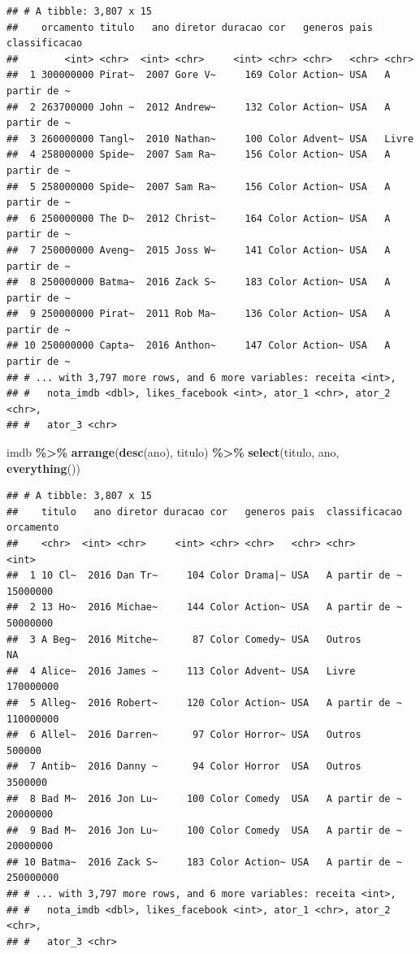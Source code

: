 \documentclass[
]{book}
\newenvironment{Shaded}{\begin{snugshade}}{\end{snugshade}}
\newcommand{\KeywordTok}[1]{\textcolor[rgb]{0.13,0.29,0.53}{\textbf{#1}}}
\newcommand{\NormalTok}[1]{#1}
\newcommand{\OperatorTok}[1]{\textcolor[rgb]{0.81,0.36,0.00}{\textbf{#1}}}
\newcommand{\StringTok}[1]{\textcolor[rgb]{0.31,0.60,0.02}{#1}}
\begin{document}
\begin{verbatim}
## # A tibble: 3,807 x 15
##    orcamento titulo   ano diretor duracao cor   generos pais  classificacao
##        <int> <chr>  <int> <chr>     <int> <chr> <chr>   <chr> <chr>        
##  1 300000000 Pirat~  2007 Gore V~     169 Color Action~ USA   A partir de ~
##  2 263700000 John ~  2012 Andrew~     132 Color Action~ USA   A partir de ~
##  3 260000000 Tangl~  2010 Nathan~     100 Color Advent~ USA   Livre        
##  4 258000000 Spide~  2007 Sam Ra~     156 Color Action~ USA   A partir de ~
##  5 258000000 Spide~  2007 Sam Ra~     156 Color Action~ USA   A partir de ~
##  6 250000000 The D~  2012 Christ~     164 Color Action~ USA   A partir de ~
##  7 250000000 Aveng~  2015 Joss W~     141 Color Action~ USA   A partir de ~
##  8 250000000 Batma~  2016 Zack S~     183 Color Action~ USA   A partir de ~
##  9 250000000 Pirat~  2011 Rob Ma~     136 Color Action~ USA   A partir de ~
## 10 250000000 Capta~  2016 Anthon~     147 Color Action~ USA   A partir de ~
## # ... with 3,797 more rows, and 6 more variables: receita <int>,
## #   nota_imdb <dbl>, likes_facebook <int>, ator_1 <chr>, ator_2 <chr>,
## #   ator_3 <chr>
\end{verbatim}

\begin{Shaded}
\begin{Highlighting}[]
\NormalTok{imdb }\OperatorTok{\%>\%}
\StringTok{  }\KeywordTok{arrange}\NormalTok{(}\KeywordTok{desc}\NormalTok{(ano), titulo) }\OperatorTok{\%>\%}
\StringTok{  }\KeywordTok{select}\NormalTok{(titulo, ano, }\KeywordTok{everything}\NormalTok{())}
\end{Highlighting}
\end{Shaded}

\begin{verbatim}
## # A tibble: 3,807 x 15
##    titulo   ano diretor duracao cor   generos pais  classificacao orcamento
##    <chr>  <int> <chr>     <int> <chr> <chr>   <chr> <chr>             <int>
##  1 10 Cl~  2016 Dan Tr~     104 Color Drama|~ USA   A partir de ~  15000000
##  2 13 Ho~  2016 Michae~     144 Color Action~ USA   A partir de ~  50000000
##  3 A Beg~  2016 Mitche~      87 Color Comedy~ USA   Outros               NA
##  4 Alice~  2016 James ~     113 Color Advent~ USA   Livre         170000000
##  5 Alleg~  2016 Robert~     120 Color Action~ USA   A partir de ~ 110000000
##  6 Allel~  2016 Darren~      97 Color Horror~ USA   Outros           500000
##  7 Antib~  2016 Danny ~      94 Color Horror  USA   Outros          3500000
##  8 Bad M~  2016 Jon Lu~     100 Color Comedy  USA   A partir de ~  20000000
##  9 Bad M~  2016 Jon Lu~     100 Color Comedy  USA   A partir de ~  20000000
## 10 Batma~  2016 Zack S~     183 Color Action~ USA   A partir de ~ 250000000
## # ... with 3,797 more rows, and 6 more variables: receita <int>,
## #   nota_imdb <dbl>, likes_facebook <int>, ator_1 <chr>, ator_2 <chr>,
## #   ator_3 <chr>
\end{verbatim}
\end{document}
